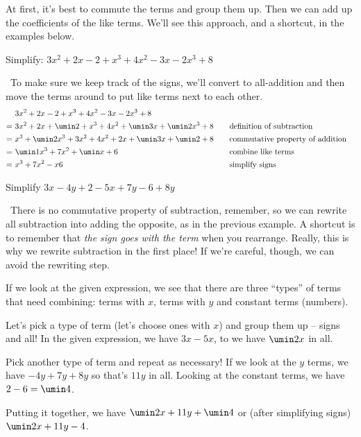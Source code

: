 At first, it's best to commute the terms and group them up. Then we can add up the coefficients of the like terms. We'll see this approach, and a shortcut, in the examples below.

\begin{boxedex}
Simplify: $3x^2 + 2x - 2 + x^3 + 4x^2 - 3x - 2x^3 + 8$

\exsoln\ To make sure we keep track of the signs, we'll convert to all-addition and then move the terms around to put like terms next to each other.
\[\begin{aligned}
	&~ 3x^2 + 2x - 2 + x^3 + 4x^2 - 3x - 2x^3 + 8\\
=	&~ 3x^2 + 2x + \umin2 + x^3 + 4x^2 + \umin3x + \umin2x^3 + 8
&& \quad \text{definition of subtraction}\\
=	&~ x^3 + \umin2x^3 + 3x^2 + 4x^2 + 2x + \umin3x + \umin2 + 8
&& \quad \text{commutative property of addition}\\
=	&~ \umin1x^3 + 7x^2 + \umin x + 6
&& \quad \text{combine like terms}\\
=	&~ x^3 + 7x^2 - x 6
&& \quad \text{simplify signs}\\
\end{aligned}\]
\end{boxedex}

\begin{boxedex}
Simplify $3x-4y+2-5x+7y-6+8y$

\exsoln\ There is no commutative property of subtraction, remember, so we can rewrite all subtraction into adding the opposite, as in the previous example. A shortcut is to remember that \textit{the sign goes with the term} when you rearrange. Really, this is why we rewrite subtraction in the first place! If we're careful, though, we can avoid the rewriting step.

If we look at the given expression, we see that there are three ``types'' of terms that need combining: terms with $x$, terms with $y$ and constant terms (numbers).

Let's pick a type of term (let's choose ones with $x$) and group them up -- signs and all! In the given expression, we have $3x-5x$, to we have $\umin2x$ in all.

Pick another type of term and repeat as necessary! If we look at the $y$ terms, we have $-4y+7y+8y$ so that's $11y$ in all. Looking at the constant terms, we have $2-6 = \umin4$.

Putting it together, we have $\umin2x + 11y + \umin4$ or (after simplifying signs) $\umin2x + 11y -4$.
\end{boxedex}


